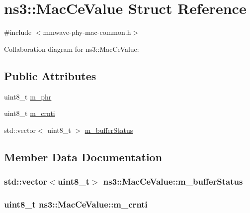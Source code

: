 \hypertarget{structns3_1_1MacCeValue}{}\section{ns3\+:\+:Mac\+Ce\+Value Struct Reference}
\label{structns3_1_1MacCeValue}


{\ttfamily \#include $<$mmwave-\/phy-\/mac-\/common.\+h$>$}



Collaboration diagram for ns3\+:\+:Mac\+Ce\+Value\+:
\subsection*{Public Attributes}
\begin{DoxyCompactItemize}
\item 
uint8\+\_\+t \hyperlink{structns3_1_1MacCeValue_a0f0480687827957b2680954767f262e7}{m\+\_\+phr}
\item 
uint8\+\_\+t \hyperlink{structns3_1_1MacCeValue_abbe46b389a5fd7eb40cf45a6f195eebe}{m\+\_\+crnti}
\item 
std\+::vector$<$ uint8\+\_\+t $>$ \hyperlink{structns3_1_1MacCeValue_ae480d602daa0df2e6733de4b5b8aa9e0}{m\+\_\+buffer\+Status}
\end{DoxyCompactItemize}


\subsection{Member Data Documentation}
\subsubsection[{\texorpdfstring{m\+\_\+buffer\+Status}{m_bufferStatus}}]{\setlength{\rightskip}{0pt plus 5cm}std\+::vector$<$uint8\+\_\+t$>$ ns3\+::\+Mac\+Ce\+Value\+::m\+\_\+buffer\+Status}\hypertarget{structns3_1_1MacCeValue_ae480d602daa0df2e6733de4b5b8aa9e0}{}\label{structns3_1_1MacCeValue_ae480d602daa0df2e6733de4b5b8aa9e0}
\subsubsection[{\texorpdfstring{m\+\_\+crnti}{m_crnti}}]{\setlength{\rightskip}{0pt plus 5cm}uint8\+\_\+t ns3\+::\+Mac\+Ce\+Value\+::m\+\_\+crnti}\hypertarget{structns3_1_1MacCeValue_abbe46b389a5fd7eb40cf45a6f195eebe}{}\label{structns3_1_1MacCeValue_abbe46b389a5fd7eb40cf45a6f195eebe}
